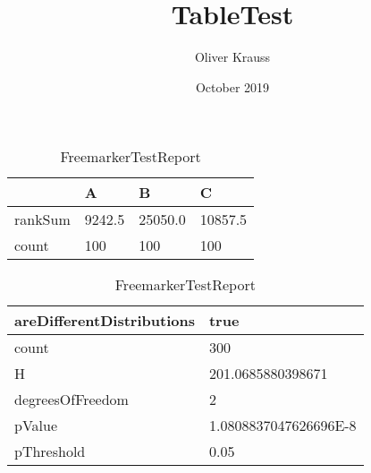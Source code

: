 \documentclass{article}
\title{TableTest}
\author{Oliver Krauss}
\date{October 2019}
\begin{document}
    \maketitle

\begin{table}[]
\begin{center}
\begin{tabular}{|l|l|l|l|}
\hline
          & \textbf{A} & \textbf{B} & \textbf{C}  \\ \hline
  rankSum & 9242.5     & 25050.0    & 10857.5      \\ \hline
    count & 100        & 100        & 100          \\ \hline
\end{tabular}

\begin{tabular}{|l|l|}
\hline
  areDifferentDistributions & true \\ \hline
                      count & 300 \\ \hline
                          H & 201.0685880398671 \\ \hline
           degreesOfFreedom & 2 \\ \hline
                     pValue & 1.0808837047626696E-8 \\ \hline
                 pThreshold & 0.05 \\ \hline
\end{tabular}
\caption{FreemarkerTestReport}
\label{tab:testTable}
\end{center}
\end{table}
\end{document}
